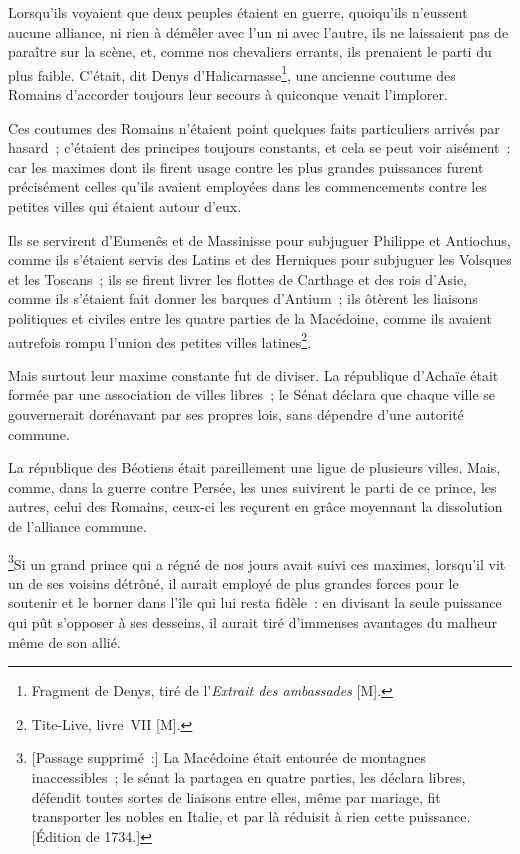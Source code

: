 \documentclass[french,twoside]{book} %
\begin{document}
Lorsqu’ils voyaient que deux peuples étaient en guerre, quoiqu’ils n’eussent aucune alliance, ni rien à démêler avec l’un ni avec l’autre, ils ne laissaient pas de paraître sur la scène, et, comme nos chevaliers errants, ils prenaient le parti du plus faible. C’était, dit Denys d’Halicarnasse\footnote{Fragment de Denys, tiré de l’{\itshape Extrait des ambassades} [M].}, une ancienne coutume des Romains d’accorder toujours leur secours à quiconque venait l’implorer.\par
Ces coutumes des Romains n’étaient point quelques faits particuliers arrivés par hasard ; c’étaient des principes toujours constants, et cela se peut voir aisément : car les maximes dont ils firent usage contre les plus grandes puissances furent précisément celles qu’ils avaient employées dans les commencements contre les petites villes qui étaient autour d’eux.\par
Ils se servirent d’Eumenês et de Massinisse pour subjuguer Philippe et Antiochus, comme ils s’étaient servis des Latins et des Herniques pour subjuguer les Volsques et les Toscans ; ils se firent livrer les flottes de Carthage et des rois d’Asie, comme ils s’étaient fait donner les barques d’Antium ; ils ôtèrent les liaisons politiques et civiles entre les quatre parties de la Macédoine, comme ils avaient autrefois rompu l’union des petites villes latines\footnote{Tite-Live, livre VII [M].}.\par
Mais surtout leur maxime constante fut de diviser. La république d’Achaïe était formée par une association de villes libres ; le Sénat déclara que chaque ville se gouvernerait dorénavant par ses propres lois, sans dépendre d’une autorité commune.\par
La république des Béotiens était pareillement une ligue de plusieurs villes. Mais, comme, dans la guerre contre Persée, les unes suivirent le parti de ce prince, les autres, celui des Romains, ceux-ci les reçurent en grâce moyennant la dissolution de l’alliance commune.\par
\footnote{[Passage supprimé :] La Macédoine était entourée de montagnes inaccessibles ; le sénat la partagea en quatre parties, les déclara libres, défendit toutes sortes de liaisons entre elles, même par mariage, fit transporter les nobles en Italie, et par là réduisit à rien cette puissance. [Édition de 1734.]}\hspace{1em}Si un grand prince qui a régné de nos jours avait suivi ces maximes, lorsqu’il vit un de ses voisins détrôné, il aurait employé de plus grandes forces pour le soutenir et le borner dans l’île qui lui resta fidèle : en divisant la seule puissance qui pût s’opposer à ses desseins, il aurait tiré d’immenses avantages du malheur même de son allié.\par
\end{document}
